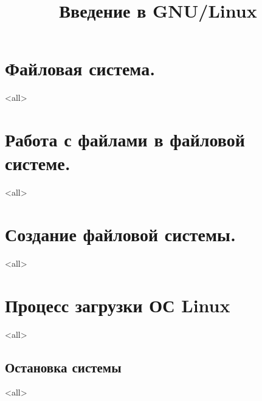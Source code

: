 

\title{Введение в GNU/Linux}




\begin{frame}
	\frametitle{}
	\titlepage
	\vspace{-0.5cm}
	\begin{center}
	\end{center}
\end{frame}


\begin{frame}
	\tableofcontents
	[hideallsubsections]
\end{frame}


\section{Файловая система.}
\mode<all>{}
\section{Работа с файлами в файловой системе.}
\mode<all>{}
\section{Создание файловой системы.}
\mode<all>{}
\section{Процесс загрузки ОС Linux}
\mode<all>{}
\subsection{Остановка системы}
\mode<all>{}

\bye
